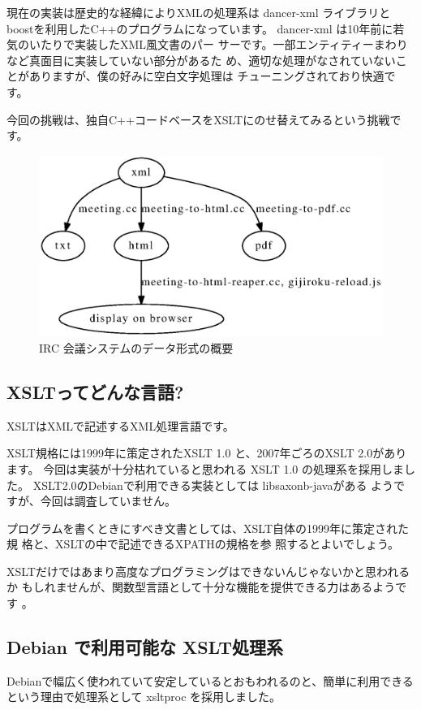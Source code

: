\documentclass[mingoth,a4paper]{jsarticle}
\begin{document}
現在の実装は歴史的な経緯によりXMLの処理系は dancer-xml ライブラリと
boostを利用したC++のプログラムになっています。
dancer-xml\cite{dancer-xml} は10年前に若気のいたりで実装したXML風文書のパー
サーです。一部エンティティーまわりなど真面目に実装していない部分があるた
め、適切な処理がなされていないことがありますが、僕の好みに空白文字処理は
チューニングされており快適です。

今回の挑戦は、独自C++コードベースをXSLTにのせ替えてみるという挑戦です。

\begin{figure}[ht]
 \begin{center}
  \includegraphics[width=0.5\hsize]{image201106/ircsystem.eps}
 \end{center}
\label{fig:ircsystem-general}\caption{IRC 会議システムのデータ形式の概要}
\end{figure}

\subsection{XSLTってどんな言語?}

XSLTはXMLで記述するXML処理言語です。

XSLT規格には1999年に策定されたXSLT 1.0 と、2007年ごろのXSLT 2.0があります。
今回は実装が十分枯れていると思われる XSLT 1.0 の処理系を採用しました。
XSLT2.0のDebianで利用できる実装としては libsaxonb-javaがある
ようですが、今回は調査していません。

プログラムを書くときにすべき文書としては、XSLT自体の1999年に策定された規
格\cite{xslt1999}と、XSLTの中で記述できるXPATHの規格\cite{xpath1999}を参
照するとよいでしょう。

XSLTだけではあまり高度なプログラミングはできないんじゃないかと思われるか
もしれませんが、関数型言語として十分な機能を提供できる力はあるようです
\cite{fxslt2003}。

\subsection{Debian で利用可能な XSLT処理系}

Debianで幅広く使われていて安定しているとおもわれるのと、簡単に利用できる
という理由で処理系として xsltproc を採用しました。
\end{document}
